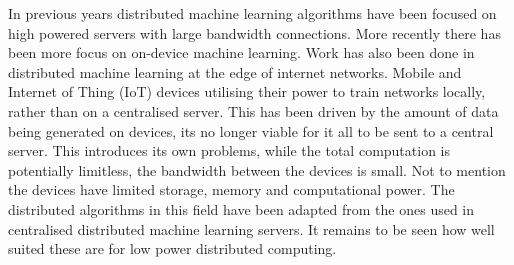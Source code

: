 In previous years distributed machine learning algorithms have been focused on
high powered servers with large bandwidth connections. More recently there has
been more focus on on-device machine learning. Work has also been done in
distributed machine learning at the edge of internet networks. Mobile and
Internet of Thing (IoT) devices utilising their power to train networks locally,
rather than on a centralised server. This has been driven by the amount of data
being generated on devices, its no longer viable for it all to be sent to a
central server. \cite{Chaing2016FogIoT} This introduces its own problems, while
the total computation is potentially limitless, the bandwidth between the
devices is small. Not to mention the devices have limited storage, memory and
computational power. The distributed algorithms in this field have been adapted
from the ones used in centralised distributed machine learning servers. It
remains to be seen how well suited these are for low power distributed
computing.


